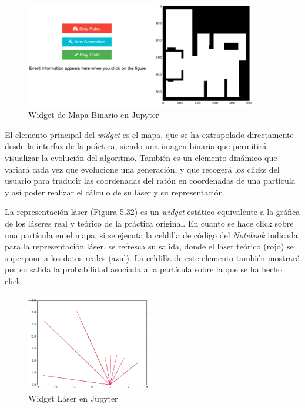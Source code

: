 \begin{figure}[H]
	\begin{center}
		\includegraphics[width=0.90\textwidth]{figures/mapabinariojupyter.png}
		\caption{Widget de Mapa Binario en Jupyter}
		\label{fig.mapabinariojupyter}
	\end{center}
\end{figure}

El elemento principal del \textit{widget} es el mapa, que se ha extrapolado directamente desde la interfaz de la práctica, siendo una imagen binaria que permitirá visualizar la evolución del algoritmo. También es un elemento dinámico que variará cada vez que evolucione una generación, y que recogerá los clicks del usuario para traducir las coordenadas del ratón en coordenadas de una partícula y así poder realizar el cálculo de su láser y su representación.

La representación láser (Figura 5.32) es un \textit{widget} estático equivalente a la gráfica de los láseres real y teórico de la práctica original. En cuanto se hace click sobre una partícula en el mapa, si se ejecuta la celdilla de código del \textit{Notebook} indicada para la representación láser, se refresca su salida, donde el láser teórico (rojo) se superpone a los datos reales (azul). La celdilla de este elemento también mostrará por su salida la probabilidad asociada a la partícula sobre la que se ha hecho click.

\begin{figure}[H]
	\begin{center}
		\includegraphics[width=0.49\textwidth]{figures/laserjupyter.png}
		\caption{Widget Láser en Jupyter}
		\label{fig.laserjupyter}
	\end{center}
\end{figure}

